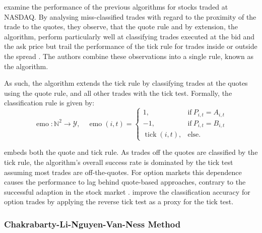 \textcite[][536]{ellisAccuracyTradeClassification2000} examine the performance of the previous algorithms for stocks traded at \gls{NASDAQ}. By analysing miss-classified trades with regard to the proximity of the trade to the quotes, they observe, that the quote rule and by extension, the  algorithm, perform particularly well at classifying trades executed at the bid and the ask price but trail the performance of the tick rule for trades inside or outside the spread \autocite[][535--536]{ellisAccuracyTradeClassification2000}. The authors combine these observations into a single rule, known as the  algorithm.

As such, the  algorithm extends the tick rule by classifying trades at the quotes using the quote rule, and all other trades with the tick test. Formally, the classification rule is given by:
\begin{equation}
    \operatorname{emo} \colon \mathbb{N}^2 \to \mathcal{Y}, \quad
    \operatorname{emo}(i, t)=
    \begin{cases}
        1,                         & \text{if}\ P_{i, t} = A_{i, t} \\
        -1,                        & \text{if}\ P_{i, t} = B_{i, t} \\
        \operatorname{tick}(i, t), & \text{else}.
    \end{cases}
    \label{eq:emo-rule}
\end{equation}

 embeds both the quote and tick rule. As trades off the quotes are classified by the tick rule, the algorithm's overall success rate is dominated by the tick test assuming most trades are off-the-quotes. For option markets \autocites[cp.][891]{savickasInferringDirectionOption2003}[][21]{grauerOptionTradeClassification2022} this dependence causes the performance to lag behind quote-based approaches, contrary to the successful adaption in the stock market \autocites[][541]{ellisAccuracyTradeClassification2000}[][3818]{chakrabartyTradeClassificationAlgorithms2007}. \textcite[][31--35]{grauerOptionTradeClassification2022} improve the classification accuracy for option trades by applying the reverse tick test as a proxy for the tick test.

\subsubsection{Chakrabarty-Li-Nguyen-Van-Ness
    Method}\label{sec:chakarabarty-li-nguyen-van-ness-method}

